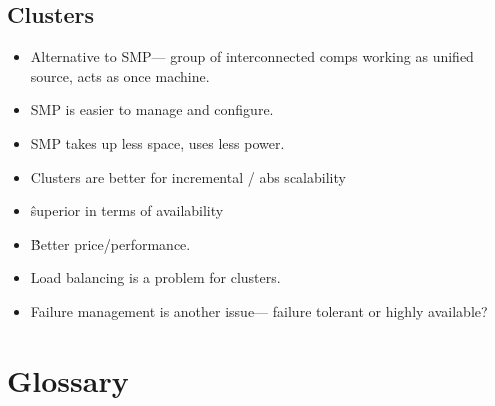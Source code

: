 \documentclass[fontsize=5pt]{scrartcl}
\begin{document}
\begin{multicols}{3}
      \subsection{Clusters}
        \begin{itemize}
          \item Alternative to SMP--- group of interconnected comps working as unified source, acts as once machine.
          \item SMP is easier to manage and configure.
          \item SMP takes up less space, uses less power.
          \item Clusters are better for incremental / abs scalability
          \item \^ superior in terms of availability
          \item \^ Better price/performance.
          \item Load balancing is a problem for clusters.
          \item Failure management is another issue--- failure tolerant or highly available?
        \end{itemize}


  \section{Glossary}

\end{multicols}
\end{document}
